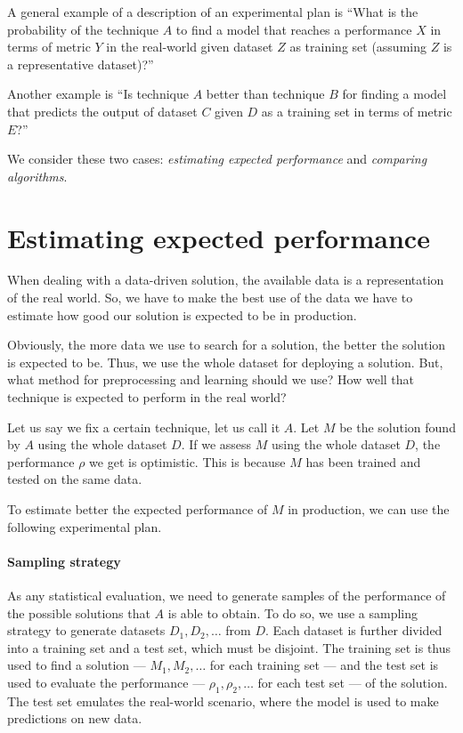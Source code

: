 A general example of a description of an experimental plan is ``What is the probability of
the technique $A$ to find a model that reaches a performance $X$ in terms of metric $Y$ in
the real-world given dataset $Z$ as training set (assuming $Z$ is a representative
dataset)?''

Another example is ``Is technique $A$ better than technique $B$ for finding a model that
predicts the output of dataset $C$ given $D$ as a training set in terms of metric $E$?''

We consider these two cases: \emph{estimating expected performance} and \emph{comparing
algorithms}.

\section{Estimating expected performance}

When dealing with a data-driven solution, the available data is a representation of the
real world.  So, we have to make the best use of the data we have to estimate how good our
solution is expected to be in production.

Obviously, the more data we use to search for a solution, the better the solution is
expected to be.  Thus, we use the whole dataset for deploying a solution.  But, what
method for preprocessing and learning should we use?  How well that technique is
expected to perform in the real world?

Let us say we fix a certain technique, let us call it $A$.  Let $M$ be the solution found
by $A$ using the whole dataset $D$.  If we assess $M$ using the whole dataset $D$, the
performance $\rho$ we get is optimistic.  This is because $M$ has been trained and tested
on the same data.

To estimate better the expected performance of $M$ in production, we can use the following
experimental plan.

\paragraph{Sampling strategy}  As any statistical evaluation, we need to generate samples
of the performance of the possible solutions that $A$ is able to obtain. To do so, we use
a sampling strategy to generate datasets $D_1, D_2, \ldots$ from $D$.  Each
dataset is further divided into a training set and a test set, which must be disjoint.
The training set is thus used to find a solution --- $M_1, M_2, \ldots$ for each
training set --- and the test set is used to evaluate the performance --- $\rho_1, \rho_2,
\ldots$ for each test set --- of the solution.  The test set emulates the real-world
scenario, where the model is used to make predictions on new data.

